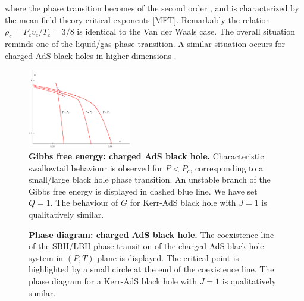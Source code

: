 \ee
where the phase transition becomes of the second order \cite{Banerjee:2010bx, MoLiu:2013}, and is characterized by the mean field theory critical exponents \eqref{MFT}. Remarkably the relation $\rho_c=P_c v_c/T_c=3/8$ is identical to  the Van der Waals case. The overall situation reminds one of the liquid/gas phase transition.  
A similar situation occurs for charged AdS black holes in higher dimensions \cite{GunasekaranEtal:2012}. 
\begin{figure}
\begin{center}
\includegraphics[width=0.4\textwidth,height=0.3\textheight]{Figures/GrnAdS.eps}
\caption{{\bf Gibbs free energy: charged AdS black hole.}
Characteristic swallowtail behaviour is observed for $P<P_c$, corresponding to a small/large black hole phase transition.
An unstable branch of the Gibbs free energy is displayed in dashed blue line. We have set $Q=1$.
The behaviour of $G$ for Kerr-AdS black hole with $J=1$ is qualitatively similar.
}
\label{Fig:Grnads}
\end{center}
\end{figure}
\begin{figure}
\begin{center}
\caption{{\bf Phase diagram: charged AdS black hole.} The coexistence line of the SBH/LBH phase transition of the charged AdS black hole system in $(P, T)$-plane is displayed. The critical point is highlighted by a small circle at the end of the coexistence line. The
phase diagram for a Kerr-AdS black hole with $J=1$ is qualitatively similar.
} \label{Fig:RNPT} 
\end{center}
\end{figure} 

